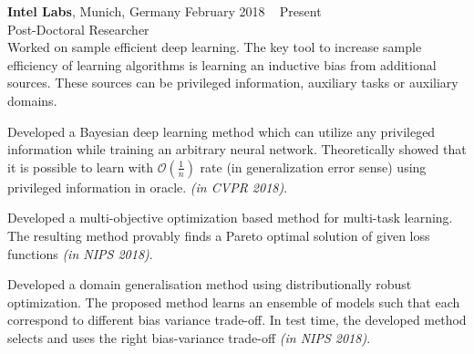  \textbf{Intel Labs}, Munich, Germany \hfill February 2018 \textendash ~ Present \vspace{0.5mm}\\ \vspace{0mm}
 \hspace{-1.5mm} Post-Doctoral Researcher  \hfill \vspace{2mm} \\
 Worked on sample efficient deep learning. The key tool to increase sample efficiency of learning algorithms is learning an inductive bias from additional sources. These sources can be privileged information, auxiliary tasks or auxiliary domains. 

Developed a Bayesian deep learning method which can utilize any privileged information while training an arbitrary neural network. Theoretically showed that it is possible to learn with $\mathcal{O}(\frac{1}{n})$ rate (in generalization error sense) using privileged information in oracle. \emph{(in CVPR 2018)}. 

Developed a multi-objective optimization based method for multi-task learning. The resulting method provably finds a Pareto optimal solution of given loss functions \emph{(in NIPS 2018)}.

Developed a domain generalisation method using distributionally robust optimization. The proposed method learns an ensemble of models such that each correspond to different bias variance trade-off. In test time, the developed method selects and uses the right bias-variance trade-off \emph{(in NIPS 2018)}.
